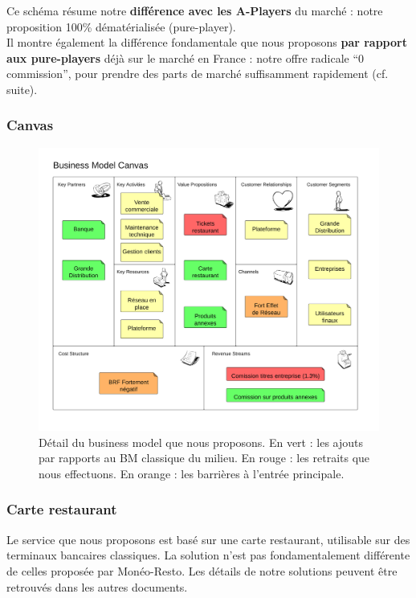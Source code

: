 Ce schéma résume notre \textbf{différence avec les A-Players} du marché : notre
proposition 100\% dématérialisée (pure-player). \\

Il montre également la différence fondamentale que nous proposons \textbf{par
rapport aux pure-players} déjà sur le marché en France : notre offre radicale
“0 commission”, pour prendre des parts de marché suffisamment rapidement (cf.
suite). \\

\subsubsection{Canvas}

  \begin{figure}[htpb]
      \centering
      \includegraphics[width=\textwidth]{image00}
      \caption{Détail du business model que nous proposons.
        En vert : les ajouts par rapports au BM classique du milieu.
        En rouge : les retraits que nous effectuons.
        En orange : les barrières à l'entrée principale.
      }
      \label{fig:image00}
  \end{figure}

\subsubsection{Carte restaurant}
Le service que nous proposons est basé sur une carte restaurant, utilisable sur
des terminaux bancaires classiques. La solution n’est pas fondamentalement
différente de celles proposée par Monéo-Resto. Les détails de notre solutions
peuvent être retrouvés dans les autres documents. \\

